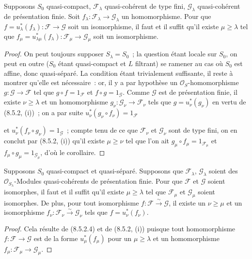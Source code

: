 \begin{corollary}[8.5.2.4]
\label{IV.8.5.2.4-fr}
Supposons $S_0$ quasi-compact, $\mathcal F_\lambda$ quasi-cohérent de type fini,
$\mathcal G_\lambda$ quasi-cohérent de présentation finie. Soit
$f_\lambda:\mathcal F_\lambda\to\mathcal G_\lambda$ un homomorphisme. Pour que
$f=u_\lambda^*(f_\lambda):\mathcal F\to\mathcal G$ soit un isomorphisme, il faut
et il suffit qu'il existe $\mu\geq\lambda$ tel que
$f_\mu=u_{\lambda\mu}^*(f_\lambda):\mathcal F_\mu\to\mathcal G_\mu$ soit un
isomorphisme.
\end{corollary}

\begin{proof}
On peut toujours supposer $S_\lambda=S_0$~; la question étant locale sur $S_0$,
on peut en outre ($S_0$ étant quasi-compact et $L$ filtrant) se ramener au cas
où $S_0$ est affine, donc quasi-séparé. La condition étant trivialement
suffisante, il reste à montrer qu'elle est nécessaire~: or, il y a par
hypothèse un $\mathcal O_S$-homomorphisme $g:\mathcal G\to\mathcal F$ tel que
$g\circ f=1_{\mathcal F}$ et $f\circ g=1_{\mathcal G}$. Comme $\mathcal G$ est
de présentation finie, il existe $\nu\geq\lambda$ et un homomorphisme
$g_\nu:\mathcal G_\nu\to\mathcal F_\nu$ tels que $g=u_\nu^*(g_\nu)$ en vertu de
(8.5.2, (i))~; on a par suite
$u_\nu^*(g_\nu\circ f_\nu)=1_{\mathcal F}$

et $u_\nu^*(f_\nu\circ g_\nu)=1_{\mathcal G}$~; compte tenu de ce que
$\mathcal F_\nu$ et $\mathcal G_\nu$ sont de type fini, on en conclut par
(8.5.2, (i)) qu'il existe $\mu\geq\nu$ tel que l'on ait
$g_\mu\circ f_\mu=1_{\mathcal F_\mu}$ et
$f_\mu\circ g_\mu=1_{\mathcal G_\mu}$, d'où le corollaire.
\end{proof}

\begin{corollary}[8.5.2.5]
\label{IV.8.5.2.5-fr}
Supposons $S_0$ quasi-compact et quasi-séparé. Supposons que
$\mathcal F_\lambda$, $\mathcal G_\lambda$ soient des
$\mathcal O_{S_\lambda}$-Modules quasi-cohérents de présentation finie. Pour
que $\mathcal F$ et $\mathcal G$ soient isomorphes, il faut et il suffit qu'il
existe $\mu\geq\lambda$ tel que $\mathcal F_\mu$ et $\mathcal G_\mu$ soient
isomorphes. De plus, pour tout isomorphisme
$f:\mathcal F\xrightarrow{\sim}\mathcal G$, il existe un $\nu\geq\mu$ et un
isomorphisme $f_\nu:\mathcal F_\nu\xrightarrow{\sim}\mathcal G_\nu$ tels que
$f=u_\nu^*(f_\nu)$.
\end{corollary}

\begin{proof}
Cela résulte de (8.5.2.4) et de (8.5.2, (i)) puisque tout homomorphisme
$f:\mathcal F\to\mathcal G$ est de la forme $u_\mu^*(f_\mu)$ pour un
$\mu\geq\lambda$ et un homomorphisme
$f_\mu:\mathcal F_\mu\to\mathcal G_\mu$.
\end{proof}

